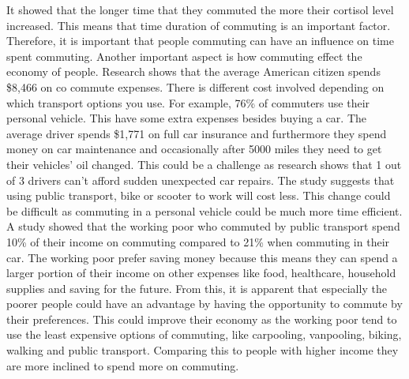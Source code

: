 It showed that the longer time that they commuted the more their cortisol level increased.
This means that time duration of commuting is an important factor.
Therefore, it is important that people commuting can have an influence on time spent commuting.
Another important aspect is how commuting effect the economy of people.
Research shows that the average American citizen spends \$8,466 on co commute expenses.
There is different cost involved depending on which transport options you use.
For example, 76\% of commuters use their personal vehicle.
This have some extra expenses besides buying a car.
The average driver spends \$1,771 on full car insurance and furthermore
they spend money on car maintenance and occasionally after 5000 miles they need to get their vehicles' oil changed.
This could be a challenge as research shows that 1 out of 3 drivers can’t afford sudden unexpected car repairs.
The study suggests that using public transport, bike or scooter to work will cost less.
This change could be difficult as commuting in a personal vehicle could be much more time efficient.
A study showed that the working poor who commuted by public transport spend 10\%
of their income on commuting compared to 21\% when commuting in their car.
The working poor prefer saving money because this means they can spend a larger portion of their income
on other expenses like food, healthcare, household supplies and saving for the future.
From this, it is apparent that especially the poorer people could have an advantage by having the opportunity
to commute by their preferences.
This could improve their economy as the working poor tend to use the least expensive options of
commuting, like carpooling, vanpooling, biking, walking and public transport.
Comparing this to people with higher income they are more inclined to spend more on commuting.
